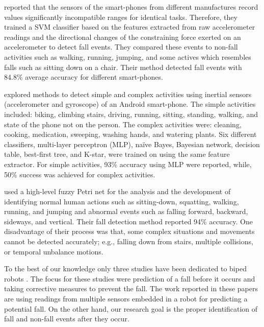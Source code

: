 \documentclass[]{IEEEtran}
\begin{document}
\cite{steidlFallDetection2012} reported that the sensors of the smart-phones from different manufactures 
record values significantly incompatible ranges for identical tasks. Therefore, they trained a SVM 
classifier based on the features extracted from raw accelerometer readings and the directional 
changes of the constraining force exerted on an accelerometer to detect fall events. They compared 
these events to non-fall activities such as walking, running, jumping, and some actives which 
resembles falls such as sitting down on a chair. Their method detected fall events with 84.8\% average 
accuracy for different smart-phones. 

\cite{DernbachActivityAndFallDetectionPhone2012} explored methods to detect simple and complex activities using inertial 
sensors (accelerometer and gyroscope) of an Android smart-phone. The simple activities included: 
biking, climbing stairs, driving, running, sitting, standing, walking, and state of the phone not 
on the person. The complex activities were: cleaning, cooking, medication, sweeping, washing hands, 
and watering plants. Six different classifiers, multi-layer  perceptron (MLP), na\"{i}ve  Bayes,  
Bayesian  network,  decision  table,  best-first tree, and  K-star,  were trained on using the same 
feature extractor. For simple activities, 93\% accuracy using MLP were reported, while, 50\% 
success was achieved for complex activities.    

\cite{ShenFallDetectionPhone2015} used a  high-level fuzzy Petri net for the analysis and the development of 
identifying normal human actions such as sitting-down, squatting, walking, running, and jumping and 
abnormal events such as falling forward, backward, sideways, and vertical. Their fall detection 
method reported 94\% accuracy. One disadvantage of their process was that, some complex situations 
and movements cannot be detected accurately; e.g., falling down from  stairs, multiple collisions, 
or temporal unbalance motions.

\par 
To the 
best of our knowledge only three studies have been dedicated to biped robots \cite{Andre2015,Goswami2014,Moya2015}. The focus for these studies were prediction of a fall before it occurs and taking corrective measures to prevent the fall. The work reported in these papers are using readings from multiple sensors embedded in a robot for predicting a potential fall. On the other hand, our research goal is the proper identification of fall and non-fall events after they occur.
\end{document}
